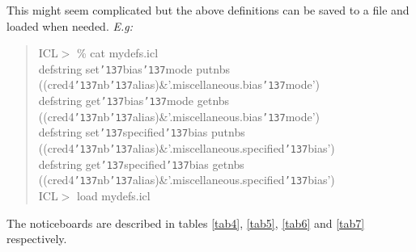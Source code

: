 \documentclass[a4paper]{book}
\renewcommand{\_}{{\tt\char'137}}
\begin{document}
This might seem complicated but the above definitions can be saved to a
file and loaded when needed. {\em E.g:}

\begin{quote}
 ICL$>$ \% cat mydefs.icl \\
 defstring set\_bias\_mode putnbs ((cred4\_nb\_alias)\&'.miscellaneous.bias\_mode') \\
 defstring get\_bias\_mode getnbs ((cred4\_nb\_alias)\&'.miscellaneous.bias\_mode') \\
 defstring set\_specified\_bias putnbs ((cred4\_nb\_alias)\&'.miscellaneous.specified\_bias') \\
 defstring get\_specified\_bias getnbs ((cred4\_nb\_alias)\&'.miscellaneous.specified\_bias') \\
 ICL$>$ load mydefs.icl
\end{quote}

The noticeboards are described in tables \ref{tab4}, \ref{tab5}, \ref{tab6} and \ref{tab7} respectively.
\end{document}
